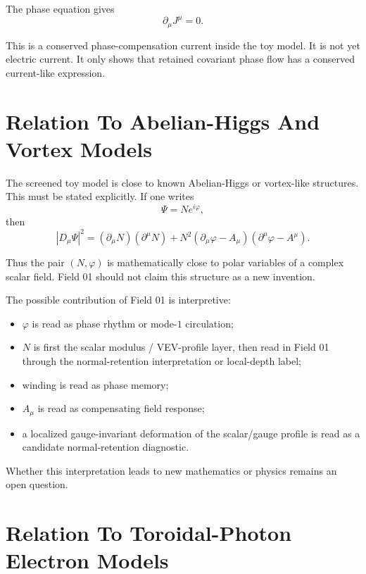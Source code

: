 \documentclass[11pt,a4paper]{article}
\newcommand{\phase}{\varphi}
\begin{document}
The phase equation gives
\begin{equation}
\partial_\mu J^\mu=0.
\end{equation}

This is a conserved phase-compensation current inside the toy model. It is not yet electric current. It only shows that retained covariant phase flow has a conserved current-like expression.

\section{Relation To Abelian-Higgs And Vortex Models}

The screened toy model is close to known Abelian-Higgs or vortex-like structures. This must be stated explicitly. If one writes
\begin{equation}
\Psi=Ne^{i\phase},
\end{equation}
then
\begin{equation}
|D_\mu\Psi|^2
=(\partial_\mu N)(\partial^\mu N)
+N^2(\partial_\mu\phase-A_\mu)(\partial^\mu\phase-A^\mu).
\end{equation}

Thus the pair $(N,\phase)$ is mathematically close to polar variables of a complex scalar field. Field 01 should not claim this structure as a new invention.

The possible contribution of Field 01 is interpretive:
\begin{itemize}
\item $\phase$ is read as phase rhythm or mode-$1$ circulation;
\item $N$ is first the scalar modulus / VEV-profile layer, then read in Field 01 through the normal-retention interpretation or local-depth label;
\item winding is read as phase memory;
\item $A_\mu$ is read as compensating field response;
\item a localized gauge-invariant deformation of the scalar/gauge profile is read as a candidate normal-retention diagnostic.
\end{itemize}

Whether this interpretation leads to new mathematics or physics remains an open question.

\section{Relation To Toroidal-Photon Electron Models}
\end{document}
